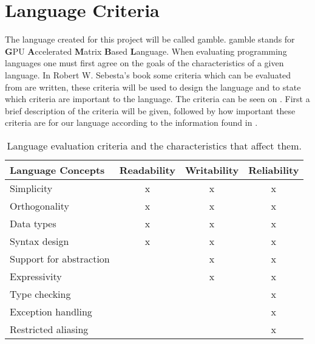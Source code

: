 \chapter{Language Criteria} %
\label{cha:language_criteria}
The language created for this project will be called \gls{gamble}.
\gls{gamble} stands for \textbf{G}PU \textbf{A}ccelerated \textbf{M}atrix \textbf{B}ased \textbf{L}anguage.
When evaluating programming languages one must first agree on the goals of the characteristics of a given language.
In Robert W. Sebesta's book some criteria which can be evaluated from are written, these criteria will be used to design the language and to state which criteria are important to the language. \citep{Sebesta}
The criteria can be seen on .
First a brief description of the criteria will be given, followed by how important these criteria are for our language according to the information found in .
\begin{table}[h]
	\centering
	\begin{tabular}{|l|c|c|c|}
	\hline
	\textbf{Language Concepts} & \textbf{Readability}  & \textbf{Writability} & \textbf{Reliability}   \\ \hline
	Simplicity                 & x      		       & x             		  & x           		   \\ \hline
	Orthogonality              & x 				       & x             		  & x           		   \\ \hline
	Data types                 & x 				       & x             		  & x           		   \\ \hline
	Syntax design              & x 				       & x             		  & x           		   \\ \hline
	Support for abstraction    &                       & x             		  & x           		   \\ \hline
	Expressivity               &                       & x             		  & x           		   \\ \hline
	Type checking              &                       &               		  & x           		   \\ \hline
	Exception handling         &                       &               		  & x           		   \\ \hline
	Restricted aliasing        &                       &               		  & x           		   \\ \hline
	\end{tabular}
	\caption{Language evaluation criteria and the characteristics that affect them.}\label{tbl:concepts}
\end{table}

